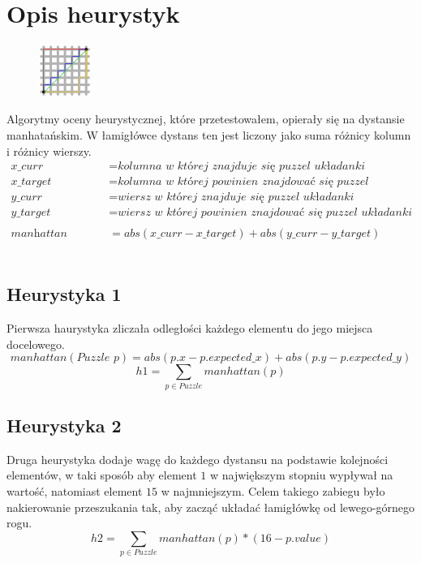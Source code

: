 \section*{Opis heurystyk}
\begin{figure}
    \centering
    \includegraphics[width=0.15\textwidth, height=0.15\textwidth]{manhattan-distance.png}
\end{figure}

Algorytmy oceny heurystycznej, które przetestowałem, opierały się na dystansie manhatańskim. W łamigłówce dystans ten jest liczony jako suma różnicy kolumn i różnicy wierszy.
\begin{align*}
    x\_curr & = \textit{kolumna w której znajduje się puzzel układanki} \\
    x\_target &= \textit{kolumna w której powinien znajdować się puzzel układanki} \\
    y\_curr &= \textit{wiersz w której znajduje się puzzel układanki} \\
    y\_target &= \textit{wiersz w której powinien znajdować się puzzel układanki} \\
    \\
    \textit{manhattan distance} &= abs(x\_curr - x\_target) + abs(y\_curr - y\_target)
\end{align*}
\\
\subsection*{Heurystyka 1}
Pierwsza haurystyka zliczała odległości każdego elementu do jego miejsca docelowego.
\[ manhattan(\textit{Puzzle p}) = abs(p.x - p.expected\_x) + abs(p.y - p.expected\_y) \]
\[ h1 = \sum_{p \in Puzzle} manhattan(p) \]

\subsection*{Heurystyka 2}
Druga heurystyka dodaje wagę do każdego dystansu na podstawie kolejności elementów, w taki sposób aby element $1$ w największym stopniu wypływał na wartość, natomiast element $15$ w najmniejszym. Celem takiego zabiegu było nakierowanie przeszukania tak, aby zacząć układać łamigłówkę od lewego-górnego rogu. 
\[ h2 = \sum_{p \in Puzzle} manhattan(p) * (16 - p.value) \]


